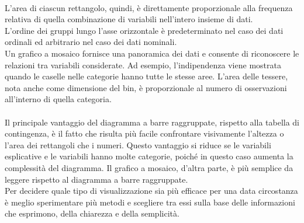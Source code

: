 \documentclass[drafts, 10pt]{book}
\begin{document}
\\
L'area di ciascun rettangolo, quindi, è direttamente proporzionale alla frequenza relativa di quella combinazione di variabili nell'intero insieme di dati.
\\
L'ordine dei gruppi lungo l'asse orizzontale è predeterminato nel caso dei dati ordinali ed arbitrario nel caso dei dati nominali.
\\
Un grafico a mosaico fornisce una panoramica dei dati e consente di riconoscere le relazioni tra variabili considerate. Ad esempio, l'indipendenza viene mostrata quando le caselle nelle categorie hanno tutte le stesse aree. L'area delle tessere, nota anche come dimensione del bin, è proporzionale al numero di osservazioni all'interno di quella categoria.
\\
\\
Il principale vantaggio del diagramma a barre raggruppate, rispetto alla tabella di contingenza, è il fatto che risulta più facile confrontare visivamente l'altezza o l'area dei rettangoli che i numeri.  Questo vantaggio si riduce se le variabili esplicative e le variabili hanno molte categorie, poiché in questo caso aumenta la complessità del diagramma. Il grafico a mosaico, d'altra parte, è più semplice da leggere rispetto al diagramma a barre raggruppate.
\\
Per decidere quale tipo di visualizzazione sia più efficace per una data circostanza è meglio sperimentare più metodi e scegliere tra essi sulla base delle informazioni che esprimono, della chiarezza e della semplicità.
\end{document}
